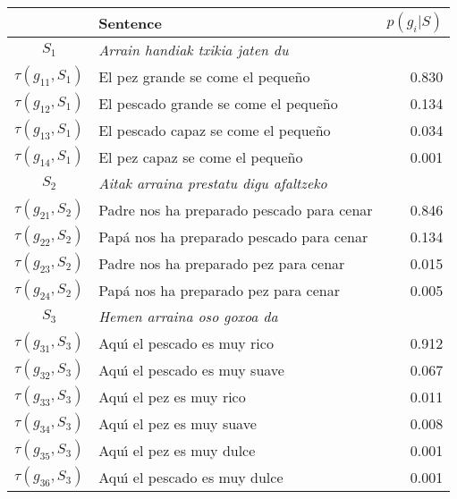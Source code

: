 \documentclass[11pt]{article}
\begin{document}
\begin{table}
 \begin{center}
  \begin{tabular}{|c|l|r|}
    \hline
       & \textbf{Sentence} & $p(g_i|S)$ \\
    \hline %
     \(S_1\) & \emph{Arrain handiak txikia jaten du}  &  \\
                        $\tau(g_{11},S_1)$ & El pez grande se come el peque\~{n}o &  0.830 \\
                        $\tau(g_{12},S_1)$ & El pescado grande se come el peque\~{n}o & 0.134 \\
                        $\tau(g_{13},S_1)$ & El pescado capaz se come el peque\~{n}o & 0.034\\
                        $\tau(g_{14},S_1)$ & El pez capaz se come el peque\~{n}o  & 0.001\\
    \hline %
     \(S_2\) & \emph{Aitak arraina prestatu digu afaltzeko} &  \\
                        $\tau(g_{21},S_2)$ & Padre nos ha preparado pescado para cenar & 0.846 \\
                        $\tau(g_{22},S_2)$ & Pap\'{a} nos ha preparado pescado para cenar & 0.134 \\
                        $\tau(g_{23},S_2)$ & Padre nos ha preparado pez para cenar & 0.015 \\
                        $\tau(g_{24},S_2)$ & Pap\'{a} nos ha preparado pez para cenar & 0.005 \\
    \hline %
    $S_3$  & \emph{Hemen arraina oso goxoa da}  & \\
                        $\tau(g_{31},S_3)$ & Aqu\'{\i} el pescado es muy rico & 0.912 \\
                        $\tau(g_{32},S_3)$ & Aqu\'{\i} el pescado es muy suave & 0.067 \\
                        $\tau(g_{33},S_3)$ & Aqu\'{\i} el pez es muy rico & 0.011 \\
                        $\tau(g_{34},S_3)$ & Aqu\'{\i} el pez es muy suave & 0.008 \\
                        $\tau(g_{35},S_3)$ & Aqu\'{\i} el pez es muy dulce & 0.001 \\
                        $\tau(g_{36},S_3)$ & Aqu\'{\i} el pescado es muy dulce & 0.001 \\
    \hline %

\end{tabular}
\end{center}
\end{table}
\end{document}
